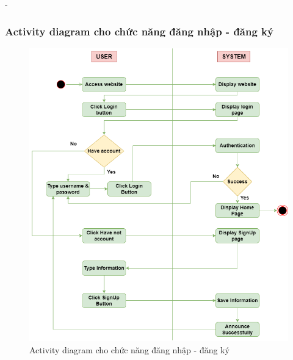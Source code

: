 \begin {list} {-}{}
\subsubsection{Activity diagram cho chức năng đăng nhập - đăng ký}
\begin{figure}[h]
    \centering
    \includegraphics[scale=0.6]{images/hieu/chap-3/login-signup-activity-diagram.png}
    \caption{Activity diagram cho chức năng đăng nhập - đăng ký}
\end{figure}
\newpage

\end{list}
